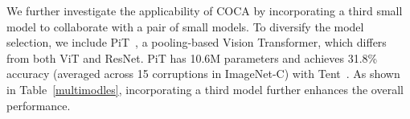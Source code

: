 
We further investigate the applicability of COCA by incorporating a third small model to collaborate with a pair of small models. To diversify the model selection, we include PiT~\cite{heo2021rethinking}, a pooling-based Vision Transformer, which differs from both ViT and ResNet. PiT has 10.6M parameters and achieves 31.8\% accuracy (averaged across 15 corruptions in ImageNet-C) with Tent~\cite{wang2020tent}. As shown in Table~\ref{multimodles}, incorporating a third model further enhances the overall performance.


\vfill

    \clearpage

